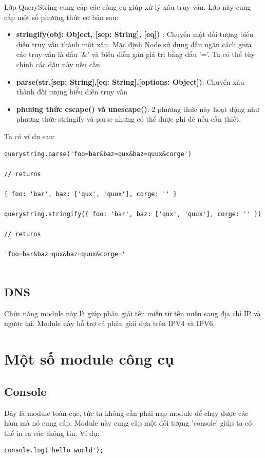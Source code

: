 	Lớp QueryString cung cấp các công cụ giúp  xử lý xâu truy vấn. Lớp này cung cấp một số phương thức cơ bản sau:\\
	
	\begin{itemize}
		\item \textbf{stringify(obj: Object, [sep: String], [eq])} : Chuyển một đối tượng biểu diễn truy vấn thành một xâu. Mặc định Node sử dụng dấu ngăn cách giữa các truy vấn là dấu '\&' và biểu diễn gán giá trị bằng dấu '='. Ta có thể tùy chỉnh các dấu này nếu cần
		\item \textbf{parse(str,[sep: String],[eq: String],[options: Object])}: Chuyển xâu thành đối tượng biểu diễn truy vấn
		\item \textbf{phương thức escape() và unescape()}: 2 phương thức này hoạt động như phương thức stringify và parse nhưng có thể được ghi đè nếu cần thiết.
	\end{itemize}
	
	Ta có ví dụ sau:\\
	
	\begin{verbatim}
querystring.parse('foo=bar&baz=qux&baz=quux&corge')

// returns

{ foo: 'bar', baz: ['qux', 'quux'], corge: '' }

querystring.stringify({ foo: 'bar', baz: ['qux', 'quux'], corge: '' })

// returns

'foo=bar&baz=qux&baz=quux&corge='
		
	\end{verbatim}
	
\subsection{DNS}
	Chức năng module này là giúp phân giải tên miền từ tên miền sang địa chỉ IP và ngược lại. Module này hỗ trợ cả phân giải dựa trên IPV4 và IPV6.
	

\section{Một số module công cụ}
	\subsection{Console}
	Đây là module toàn cục, tức ta không cần phải nạp module để chạy được các hàm mà nó cung cấp. Module này cung câp một đối tượng 'console' giúp ta có thể in ra các thông tin. Ví dụ:
	\begin{verbatim}
console.log('hello world');
	\end{verbatim}

